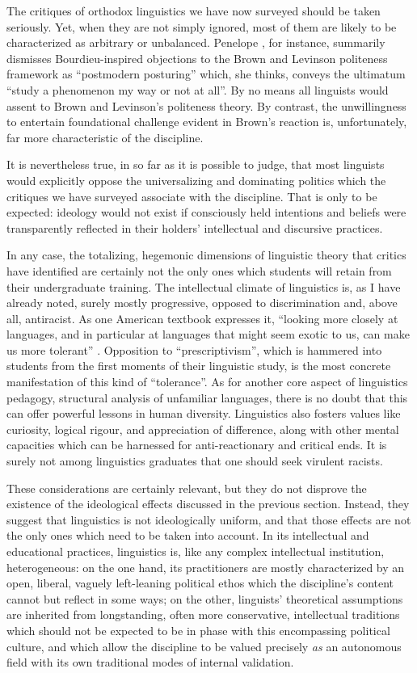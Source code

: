 \documentclass[output=paper]{langscibook}
\begin{document}
The critiques of orthodox linguistics we have now surveyed should be taken seriously. Yet, when they are not simply ignored, most of them are likely to be characterized as arbitrary or unbalanced. Penelope \citet[391]{Brown2017}, for instance, summarily dismisses Bourdieu-inspired objections to the Brown and Levinson politeness framework as ``postmodern posturing'' which, she thinks, conveys the ultimatum ``study a phenomenon my way or not at all''. By no means all linguists would assent to Brown and Levinson's politeness theory. By contrast, the unwillingness to entertain foundational challenge evident in Brown’s reaction is, unfortunately, far more characteristic of the discipline.

It is nevertheless true, in so far as it is possible to judge, that most linguists would explicitly oppose the universalizing and dominating politics which the critiques we have surveyed associate with the discipline. That is only to be expected: ideology would not exist if consciously held intentions and beliefs were transparently reflected in their holders' intellectual and discursive practices.

In any case, the totalizing, hegemonic dimensions of linguistic theory that critics have identified are certainly not the only ones which students will retain from their undergraduate training. The intellectual climate of linguistics is, as I have already noted, surely mostly progressive, opposed to discrimination and, above all, antiracist. As one American textbook expresses it, ``looking more closely at languages, and in particular at languages that might seem exotic to us, can make us more tolerant'' \citep{Gasser2012}. Opposition to ``prescriptivism'', which is hammered into students from the first moments of their linguistic study, is the most concrete manifestation of this kind of ``tolerance''. As for another core aspect of linguistics pedagogy, structural analysis of unfamiliar languages, there is no doubt that this can offer powerful lessons in human diversity. Linguistics also fosters values like curiosity, logical rigour, and appreciation of difference, along with other mental capacities which can be harnessed for anti-reactionary and critical ends. It is surely not among linguistics graduates that one should seek virulent racists.

These considerations are certainly relevant, but they do not disprove the existence of the ideological effects discussed in the previous section. Instead, they suggest that linguistics is not ideologically uniform, and that those effects are not the only ones which need to be taken into account. In its intellectual and educational practices, linguistics is, like any complex intellectual institution, heterogeneous: on the one hand, its practitioners are mostly characterized by an open, liberal, vaguely left-leaning political ethos which the discipline's content cannot but reflect in some ways; on the other, linguists' theoretical assumptions are inherited from longstanding, often more conservative, intellectual traditions which should not be expected to be in phase with this encompassing political culture, and which allow the discipline to be valued precisely \emph{as} an autonomous field with its own traditional modes of internal validation.
\end{document}
